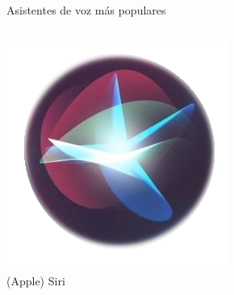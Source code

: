 \documentclass{beamer}
\begin{document}
\begin{frame}[c]{Asistentes de voz más populares}
    \vspace{2em}

    \begin{columns}
      \begin{column}{\textwidth}
        \centering
        \hyperlink{apple-siri}{\includegraphics[scale=.4]{apple-siri-logo.png}}\\
        (Apple) Siri
      \end{column}
    \end{columns}
  \end{frame}
\end{document}
